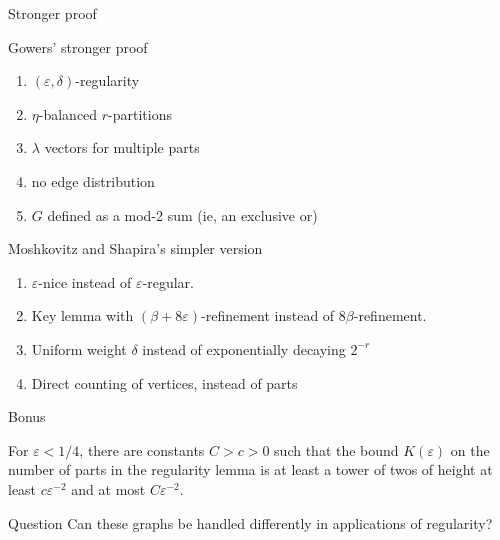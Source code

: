 \documentclass{beamer}
\newcommand{\1}{\mathbbm{1}}
\newcommand{\eps}{\varepsilon}
\begin{document}
\begin{frame}{Stronger proof}
  \begin{block}{Gowers' stronger proof}
    \begin{enumerate}
      \pause
    \item $(\eps, \delta)$-regularity

      \pause
      \item $\eta$-balanced $r$-partitions

            \pause
      \item $\lambda$ vectors for multiple parts

            \pause
      \item no edge distribution

            \pause
      \item $G$ defined as a mod-2 sum (ie, an exclusive or)
    \end{enumerate}
  \end{block}

  \pause
  \begin{block}{Moshkovitz and Shapira's simpler version}
    \begin{enumerate}
      \item $\eps$-nice instead of $\eps$-regular.

            \pause
      \item Key lemma with $(\beta + 8\eps)$-refinement instead of $8 \beta$-refinement.

            \pause
      \item Uniform weight $\delta$ instead of exponentially decaying $2^{-r}$

            \pause
      \item Direct counting of vertices, instead of parts
    \end{enumerate}
  \end{block}
\end{frame}

\begin{frame}{Bonus}
  \begin{theorem}
    For $\eps < 1/4$, there are constants $C > c > 0$ such that the bound $K(\eps)$ on
    the number of parts in the regularity lemma is at least a tower of twos of height at
    least $c \eps^{-2}$ and at most $C \eps^{-2}$.
  \end{theorem}

  \begin{block}{Question}
    Can these graphs be handled differently in applications of regularity?
  \end{block}
\end{frame}
\end{document}
